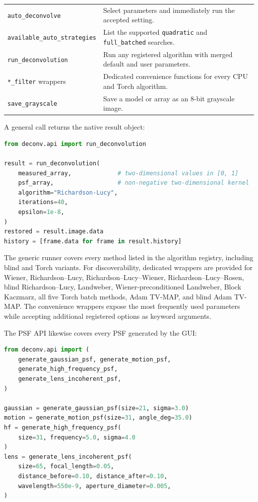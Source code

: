\documentclass[10pt,a4paper]{article}
\newcommand{\code}[1]{\texttt{#1}}
\begin{document}
\begin{longtable}{>{\raggedright\arraybackslash}p{}>{\raggedright\arraybackslash}p{}}
\code{auto\_deconvolve}&Select parameters and immediately run the accepted setting.\\
\code{available\_auto\_strategies}&List the supported \code{quadratic} and \code{full\_batched} searches.\\
\code{run\_deconvolution}&Run any registered algorithm with merged default and user parameters.\\
\code{*\_filter} wrappers&Dedicated convenience functions for every CPU and Torch algorithm.\\
\code{save\_grayscale}&Save a model or array as an 8-bit grayscale image.\\\bottomrule
\end{longtable}

A general call returns the native result object:
\begin{lstlisting}[language=Python]
from deconv.api import run_deconvolution

result = run_deconvolution(
    measured_array,             # two-dimensional values in [0, 1]
    psf_array,                  # non-negative two-dimensional kernel
    algorithm="Richardson-Lucy",
    iterations=40,
    epsilon=1e-8,
)
restored = result.image.data
history = [frame.data for frame in result.history]
\end{lstlisting}


The generic runner covers every method listed in the algorithm registry, including blind and Torch variants.  For discoverability, dedicated wrappers are provided for Wiener, Richardson--Lucy, Richardson--Lucy--Wiener, Richardson--Lucy--Rosen, blind Richardson--Lucy, Landweber, Wiener-preconditioned Landweber, Block Kaczmarz, all five Torch batch methods, Adam TV-MAP, and blind Adam TV-MAP.  The convenience wrappers expose the most frequently used parameters while accepting additional registered options as keyword arguments.

The PSF API likewise covers every PSF generated by the GUI:
\begin{lstlisting}[language=Python]
from deconv.api import (
    generate_gaussian_psf, generate_motion_psf,
    generate_high_frequency_psf,
    generate_lens_incoherent_psf,
)

gaussian = generate_gaussian_psf(size=21, sigma=3.0)
motion = generate_motion_psf(size=31, angle_deg=35.0)
hf = generate_high_frequency_psf(
    size=31, frequency=5.0, sigma=4.0
)
lens = generate_lens_incoherent_psf(
    size=65, focal_length=0.05,
    distance_before=0.10, distance_after=0.10,
    wavelength=550e-9, aperture_diameter=0.005,
)
\end{lstlisting}
\end{document}
